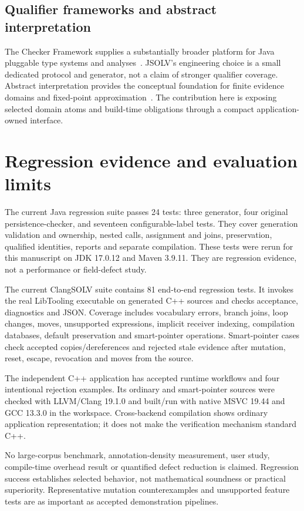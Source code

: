\documentclass[11pt]{article}
\begin{document}
\subsection{Qualifier frameworks and abstract interpretation}
The Checker Framework supplies a substantially broader platform for Java
pluggable type systems and analyses~\cite{checker-framework}. JSOLV's engineering
choice is a small dedicated protocol and generator, not a claim of stronger
qualifier coverage. Abstract interpretation provides the conceptual foundation
for finite evidence domains and fixed-point approximation~\cite{abstract}.
The contribution here is exposing selected domain atoms and build-time
obligations through a compact application-owned interface.

\section{Regression evidence and evaluation limits}
The current Java regression suite passes 24 tests: three generator,
four original persistence-checker, and seventeen configurable-label tests.
They cover generation validation and ownership, nested calls, assignment and
joins, preservation, qualified identities, reports and separate compilation.
These tests were rerun for this manuscript on JDK 17.0.12 and Maven 3.9.11.
They are regression evidence, not a performance or field-defect study.

The current ClangSOLV suite contains 81 end-to-end regression tests. It invokes
the real LibTooling executable on generated C++ sources and checks acceptance,
diagnostics and JSON. Coverage includes vocabulary errors, branch joins,
loop changes, moves, unsupported expressions, implicit receiver indexing,
compilation databases, default preservation and smart-pointer operations.
Smart-pointer cases check accepted copies/dereferences and rejected stale
evidence after mutation, reset, escape, revocation and moves from the source.

The independent C++ application has accepted runtime workflows and four
intentional rejection examples. Its ordinary and smart-pointer sources were
checked with LLVM/Clang 19.1.0 and built/run with native MSVC 19.44 and GCC
13.3.0 in the workspace. Cross-backend compilation shows ordinary application
representation; it does not make the verification mechanism standard C++.

No large-corpus benchmark, annotation-density measurement, user study,
compile-time overhead result or quantified defect reduction is claimed.
Regression success establishes selected behavior, not mathematical soundness
or practical superiority. Representative mutation counterexamples and unsupported
feature tests are as important as accepted demonstration pipelines.
\end{document}
